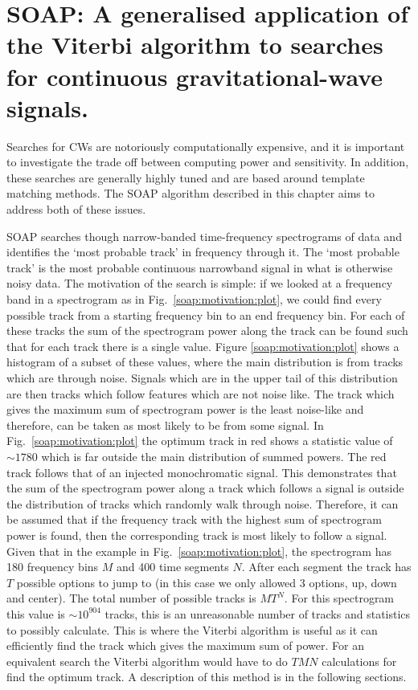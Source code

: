 \chapter[SOAP for CW searches.]{\label{soap} SOAP: A generalised application of the Viterbi algorithm to searches for continuous gravitational-wave signals.}

Searches for \glspl{CW} are notoriously computationally expensive, and it is important to investigate the trade off between computing power and sensitivity.
In addition, these searches are generally highly tuned and are based around template matching methods. The SOAP \citep{ellis2006SnakesPlanea} algorithm described in this chapter aims to address both of these issues.

SOAP searches though narrow-banded time-frequency spectrograms of data and identifies the `most probable track' in frequency through it.  The `most probable track' is the most probable continuous narrowband signal in what is otherwise noisy data.  
The motivation of the search is simple: if we looked at a frequency band in a
spectrogram as in Fig.~\ref{soap:motivation:plot}, we could find every possible track from a starting frequency bin to an end frequency bin.
For each of these tracks the sum of the spectrogram power along the track can
be found such that for each track there is a single value.
Figure \ref{soap:motivation:plot} shows a histogram of a subset of these values, where the main distribution is from tracks which are through noise.
Signals which are in the upper tail of this distribution are then tracks which follow features which are not noise like.
The track which gives the maximum sum of spectrogram power is the least noise-like and therefore, can be taken as most likely to be from some signal.
In Fig.~\ref{soap:motivation:plot} the optimum track in red shows a
statistic value of $\sim 1780$ which is far outside the main distribution of
summed powers.  The red track follows that of an injected monochromatic signal.  This
demonstrates that the sum of the spectrogram power along a track which follows
a signal is outside the distribution of tracks which randomly walk through noise.
Therefore, it can be assumed that if the frequency track with the highest sum
of spectrogram power is found, then the corresponding track is most likely
to follow a signal.  Given that in the example in Fig.~\ref{soap:motivation:plot}, the
spectrogram has 180 frequency bins $M$ and 400 time segments $N$.
After each segment the track has $T$ possible options to jump to (in this case
we only allowed 3 options, up, down and center). The total number of possible tracks is $MT^{N}$.
For this spectrogram this value is $\sim 10^{904}$ tracks, this is an unreasonable
number of tracks and statistics to possibly calculate. This is where the Viterbi algorithm
\citep{viterbi1967ErrorBounds} is useful as it can efficiently find the track
which gives the maximum sum of power. For an equivalent search the Viterbi
algorithm would have to do $TMN$ calculations for find the optimum track. A description of this method is in the following sections.

